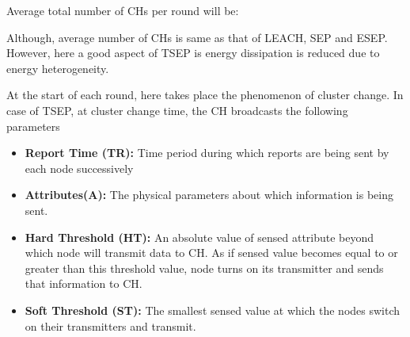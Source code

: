 \documentclass[conference]{IEEEtran}
\begin{document}
Average total number of CHs per round will be:


Although, average number of CHs is same as that of LEACH, SEP and ESEP. However, here a good aspect of TSEP is energy dissipation is reduced due to energy heterogeneity.

At the start of each round, here takes place the phenomenon of cluster change. In case of TSEP, at cluster change time, the CH broadcasts the following parameters\\
\begin{itemize}
  \item \textbf{Report Time (TR):} Time period during which reports are being sent by each node successively\\
  \item \textbf{Attributes(A):} The physical parameters about which information is being sent.\\
  \item \textbf{Hard Threshold (HT):} An absolute value of sensed attribute beyond which node will transmit data to CH. As if sensed value becomes equal to or greater than this threshold value, node turns on its transmitter and sends that information to CH.\\
  \item \textbf{Soft Threshold (ST):} The smallest sensed value at which the nodes switch on their transmitters and transmit.\\

\end{itemize}
\end{document}
